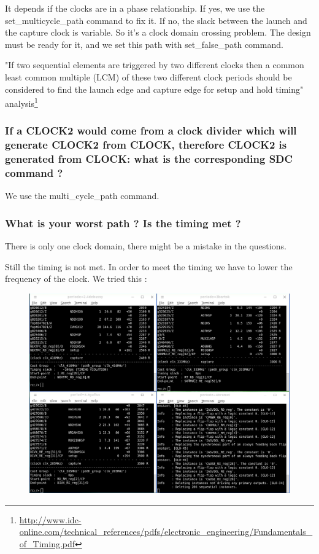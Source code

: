 \documentclass[11pt,a4paper,sans,dvipsnames]{report}
\begin{document}
	It depends if the clocks are in a phase relationship. If yes, we use the set\_multicycle\_path command to fix it.
	If no, the slack between the launch and the capture clock is variable. So it's a clock domain crossing problem. The design must be ready for it, and we set this path with set\_false\_path command.

	"If two sequential elements are triggered by two different clocks then a common least common  multiple (LCM) of these two different clock periods should be considered to find the launch edge and capture edge for setup and hold timing" analysis\footnote{\url{http://www.idc-online.com/technical_references/pdfs/electronic_engineering/Fundamentals_of_Timing.pdf}}


	\subsubsection*{If a CLOCK2 would come from a clock divider which will generate CLOCK2 from
		CLOCK, therefore CLOCK2 is generated from CLOCK: what is the corresponding SDC command ?}
	We use the multi\_cycle\_path command.

	\newpage
	\subsubsection*{What is your worst path ? Is the timing met ?}
	There is only one clock domain, there might be a mistake in the questions.

	Still the timing is not met. In order to meet the timing we have to lower the frequency of the clock. We tried this :
	\begin{figure}[h!]
		\centering
		\includegraphics[width=\linewidth]{images/script.png}
		\label{fig:scripting_synthesis}
	\end{figure}
\end{document}
